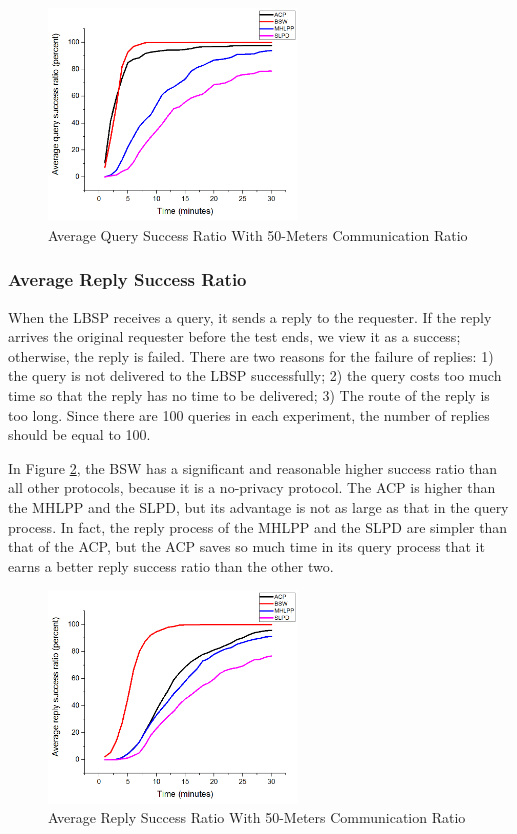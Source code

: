 \documentclass[conference]{IEEEtran}
\begin{document}
\begin{figure} [hbtp]
  \centering 
  \includegraphics[width=2.6in]{figures/F416AverageQuerySuccessRatioWith50MetersCommunicationRatio.png}
  \caption{Average Query Success Ratio With 50-Meters Communication Ratio} 
  \label{fig:F416AverageQuerySuccessRatioWith50MetersCommunicationRatio} %
\end{figure}

\subsubsection{ Average Reply Success Ratio}

When the LBSP receives a query, it sends a reply to the requester. If the reply arrives the original requester before the test ends, we view it as a success; otherwise, the reply is failed. There are two reasons for the failure of replies: 1) the query is not delivered to the LBSP successfully; 2) the query costs too much time so that the reply has no time to be delivered; 3) The route of the reply is too long. Since there are 100 queries in each experiment, the number of replies should be equal to 100. 

In Figure \ref{fig:F417AverageReplySuccessRatioWith50MetersCommunicationRatio}, the BSW has a significant and reasonable higher success ratio than all other protocols, because it is a no-privacy protocol. The ACP is higher than the MHLPP and the SLPD, but its advantage is not as large as that in the query process. In fact, the reply process of the MHLPP and the SLPD are simpler than that of the ACP, but the ACP saves so much time in its query process that it earns a better reply success ratio than the other two.

\begin{figure} [hbtp]
  \centering 
  \includegraphics[width=2.6in]{figures/F417AverageReplySuccessRatioWith50MetersCommunicationRatio.png}
  \caption{Average Reply Success Ratio With 50-Meters Communication Ratio} 
  \label{fig:F417AverageReplySuccessRatioWith50MetersCommunicationRatio} %
\end{figure}
\end{document}
